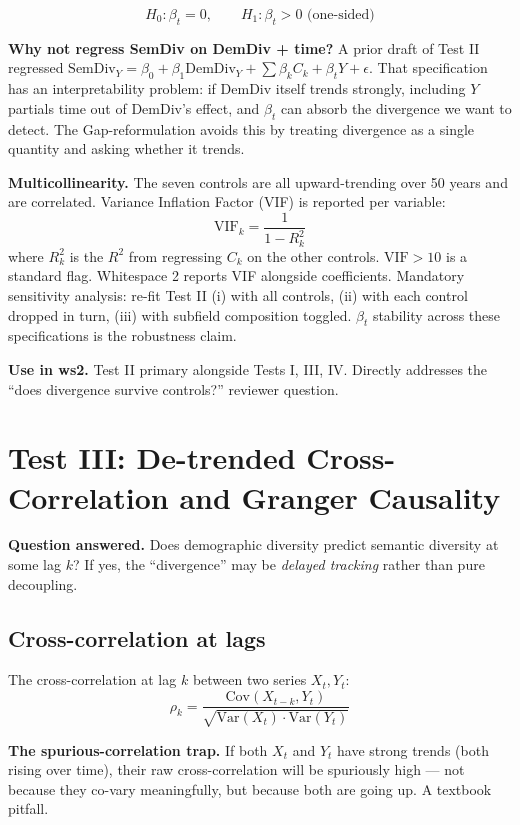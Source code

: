 \documentclass[11pt]{article}
\begin{document}
\[
  H_0: \beta_t = 0, \qquad H_1: \beta_t > 0 \text{ (one-sided)}
\]

\textbf{Why not regress SemDiv on DemDiv + time?} A prior draft of
Test II regressed $\text{SemDiv}_Y = \beta_0 + \beta_1 \text{DemDiv}_Y
+ \sum \beta_k C_k + \beta_t Y + \epsilon$. That specification has an
interpretability problem: if DemDiv itself trends strongly, including
$Y$ partials time out of DemDiv's effect, and $\beta_t$ can absorb the
divergence we want to detect. The Gap-reformulation avoids this by
treating divergence as a single quantity and asking whether it trends.

\textbf{Multicollinearity.} The seven controls are all upward-trending
over 50 years and are correlated. Variance Inflation Factor (VIF) is
reported per variable:
\[
  \text{VIF}_k = \frac{1}{1 - R_k^2}
\]
where $R_k^2$ is the $R^2$ from regressing $C_k$ on the other controls.
$\text{VIF} > 10$ is a standard flag. Whitespace 2 reports VIF
alongside coefficients. Mandatory sensitivity analysis: re-fit Test II
(i) with all controls, (ii) with each control dropped in turn, (iii)
with subfield composition toggled. $\beta_t$ stability across these
specifications is the robustness claim.

\textbf{Use in ws2.} Test II primary alongside Tests I, III, IV.
Directly addresses the ``does divergence survive controls?''
reviewer question.

\section{Test III: De-trended Cross-Correlation and Granger Causality}
\label{sec:test-iii}

\textbf{Question answered.} Does demographic diversity predict semantic
diversity at some lag $k$? If yes, the ``divergence'' may be
\textit{delayed tracking} rather than pure decoupling.

\subsection{Cross-correlation at lags}

The cross-correlation at lag $k$ between two series $X_t, Y_t$:
\[
  \rho_k = \frac{\text{Cov}(X_{t-k}, Y_t)}{\sqrt{\text{Var}(X_t) \cdot
  \text{Var}(Y_t)}}
\]

\textbf{The spurious-correlation trap.} If both $X_t$ and $Y_t$ have
strong trends (both rising over time), their raw cross-correlation
will be spuriously high --- not because they co-vary meaningfully, but
because both are going up. A textbook pitfall.
\end{document}
